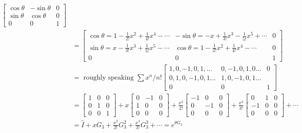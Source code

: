 \documentclass[10pt]{article}
\begin{document}
\begin{align*}
	\begin{bmatrix} 
		\cos \theta & - \sin \theta & 0 \\
		\sin \theta & \cos \theta & 0 \\ 
		0 & 0 & 1
	\end{bmatrix} \\ &=
	\begin{bmatrix} 
	\cos \theta = 1 - \frac{1}{2!} x^2 + \frac{1}{4!} x^{4} - \cdots   
	& 
-	\sin \theta = - x + \frac{1}{3!} x^3 - \frac{1}{5!} x^{5} + \cdots 
	&
	0
	\\
		\sin \theta = x - \frac{1}{3!} x^3 + \frac{1}{5!} x^{5} - \cdots & 
		\cos \theta = 1 - \frac{1}{2!} x^2 + \frac{1}{4!} x^{4} - \cdots  & 
0 \\ 
		0 & 0 & 1  
	\end{bmatrix}  \\  
	& = \text{ roughly speaking } 
	\sum x^{n}/n!
	\begin{bmatrix} 
		1,0,-1,0,1, \ldots & 
		0, -1, 0 , 1, 0 \ldots & 0 
		\\
		0, 1, 0, -1, 0, 1 \ldots  & 
		1, 0, -1, 0, 1 \ldots \\ 
		0 & 0 & 1 
	\end{bmatrix}  \\ 
	&= 
	\begin{bmatrix} 1&0&0\\0&1&0\\0&0&1 \end{bmatrix}  + 
	x 
	\begin{bmatrix} 0&-1&0\\1&0&0\\0&0&0 \end{bmatrix}  + 
	\frac{x^2}{2!} 
	\begin{bmatrix} -1&0&0\\0&-1&0\\0&0&0 \end{bmatrix} + 
	\frac{x^3}{3!} 
	\begin{bmatrix} 0&1&0\\-1&0&0\\0&0&0 \end{bmatrix}  + \cdots
	\\ &= 
\hat{I} + x G_3 + \frac{x^2}{2!} G_3^2 + \frac{x^3}{3!} G_3^3 + \cdots
= e^{\theta G_3} 
\end{align*}
\end{document}
